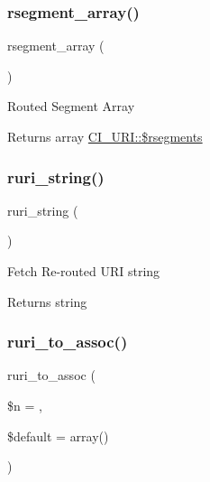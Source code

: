 \subsubsection{\texorpdfstring{rsegment\+\_\+array()}{rsegment\_array()}}
{\footnotesize\ttfamily rsegment\+\_\+array (\begin{DoxyParamCaption}{ }\end{DoxyParamCaption})}

Routed Segment Array

\begin{DoxyReturn}{Returns}
array \mbox{\hyperlink{class_c_i___u_r_i_abf60189292b5fda02cdf36e5d7417a33}{C\+I\+\_\+\+U\+R\+I\+::\$rsegments}} 
\end{DoxyReturn}
\mbox{\label{class_c_i___u_r_i_a53a97a8b68f500980b84e3b060400221}} 
\subsubsection{\texorpdfstring{ruri\+\_\+string()}{ruri\_string()}}
{\footnotesize\ttfamily ruri\+\_\+string (\begin{DoxyParamCaption}{ }\end{DoxyParamCaption})}

Fetch Re-\/routed U\+RI string

\begin{DoxyReturn}{Returns}
string 
\end{DoxyReturn}
\mbox{\label{class_c_i___u_r_i_a3f375a2026349f1fce7915966eba6d5b}} 
\subsubsection{\texorpdfstring{ruri\+\_\+to\+\_\+assoc()}{ruri\_to\_assoc()}}
{\footnotesize\ttfamily ruri\+\_\+to\+\_\+assoc (\begin{DoxyParamCaption}\item[{}]{\$n = {},  }\item[{}]{\$default = {\ttfamily array()} }\end{DoxyParamCaption})}

